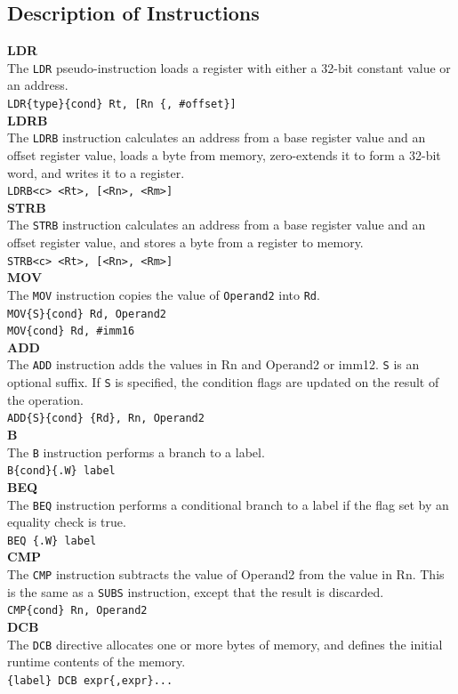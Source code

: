 \documentclass[footheight=20pt, footsepline, headheight=20pt, headsepline]{scrartcl}
\begin{document}
\subsection*{Description of Instructions}
\textbf{LDR}\\
The \verb|LDR| pseudo-instruction loads a register with either a 32-bit constant value or an address.\\
\verb|LDR{type}{cond} Rt, [Rn {, #offset}]| \\
\textbf{LDRB}\\
The \verb|LDRB| instruction calculates an address from a base register value and an offset register value, loads a byte from memory, zero-extends it to form a 32-bit word, and writes it to a register. \\
\verb|LDRB<c> <Rt>, [<Rn>, <Rm>]|\\
\textbf{STRB}\\
The \verb|STRB| instruction calculates an address from a base register value and an offset register value, and stores a byte from a register to memory. \\
\verb|STRB<c> <Rt>, [<Rn>, <Rm>]|\\
\textbf{MOV}\\The \verb|MOV| instruction copies the value of \verb|Operand2| into \verb|Rd|.\\
\verb|MOV{S}{cond} Rd, Operand2|\\
\verb|MOV{cond} Rd, #imm16|\\
\textbf{ADD}\\
The \verb|ADD| instruction adds the values in Rn and Operand2 or imm12. \verb|S| is an optional suffix. If \verb|S| is specified, the condition flags are updated on the result of the operation.\\
\verb|ADD{S}{cond} {Rd}, Rn, Operand2|\\
\textbf{B}\\
The \verb|B| instruction performs a branch to a label.\\
\verb|B{cond}{.W} label|\\
\textbf{BEQ}\\
The \verb|BEQ| instruction performs a conditional branch to a label if the flag set by an equality check is true.\\
\verb|BEQ {.W} label|\\
\textbf{CMP}\\
The \verb|CMP| instruction subtracts the value of Operand2 from the value in Rn. This is the same as a \verb|SUBS| instruction, except that the result is discarded.\\
\verb|CMP{cond} Rn, Operand2|\\
\textbf{DCB}\\
The \verb|DCB| directive allocates one or more bytes of memory, and defines the initial runtime contents of the memory.\\
\verb|{label} DCB expr{,expr}...|\\
\end{document}
